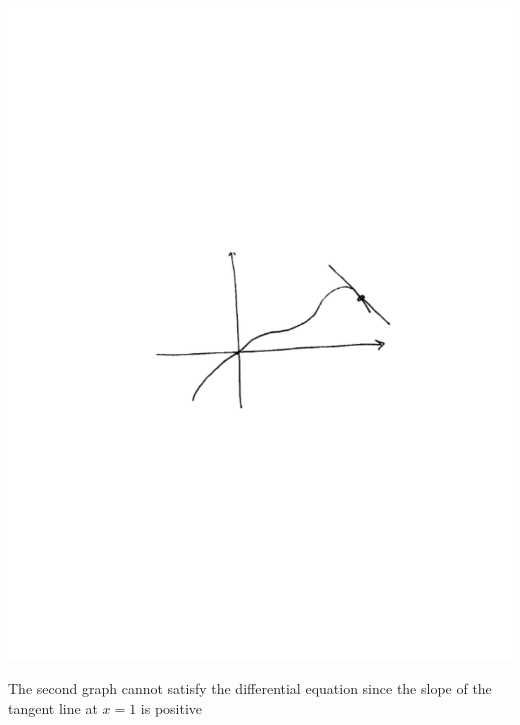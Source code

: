 \documentclass[handout, instructornotes]{ximera}
\begin{document}
\begin{problem}
\begin{freeResponse}
	\begin{image}
	\includegraphics[trim= 170 300 190 310, scale=1]{Figure8-1-2.pdf}	
	\end{image}
	
	The second graph cannot satisfy the differential equation since the slope of the tangent line at $x=1$ is positive
	

\end{freeResponse}
\end{problem}
\end{document}

